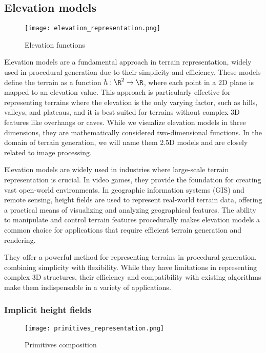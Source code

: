 \subsection{Elevation models}

\begin{figure}[H]
    \centering
    \texttt{[image: elevation\_representation.png]}
    \caption{Elevation functions}
    \label{fig:erosion-elevation-representation}
\end{figure}

Elevation models are a fundamental approach in terrain representation, widely used in procedural generation due to their simplicity and efficiency. These models define the terrain as a function $h : \R^2 \to \R$, where each point in a 2D plane is mapped to an elevation value. This approach is particularly effective for representing terrains where the elevation is the only varying factor, such as hills, valleys, and plateaus, and it is best suited for terrains without complex 3D features like overhangs or caves. While we visualize elevation models in three dimensions, they are mathematically considered two-dimensional functions. In the domain of terrain generation, we will name them 2.5D models and are closely related to image processing.

Elevation models are widely used in industries where large-scale terrain representation is crucial. In video games, they provide the foundation for creating vast open-world environments. In geographic information systems (GIS) and remote sensing, height fields are used to represent real-world terrain data, offering a practical means of visualizing and analyzing geographical features. The ability to manipulate and control terrain features procedurally makes elevation models a common choice for applications that require efficient terrain generation and rendering.

They offer a powerful method for representing terrains in procedural generation, combining simplicity with flexibility. While they have limitations in representing complex 3D structures, their efficiency and compatibility with existing algorithms make them indispensable in a variety of applications.

\subsubsection{Implicit height fields}

\begin{wrapfigure}{L}{0.4\textwidth}
    \texttt{[image: primitives\_representation.png]}
    \caption{Primitives composition}
    \label{fig:erosion-primitives-representation}
\end{wrapfigure}

